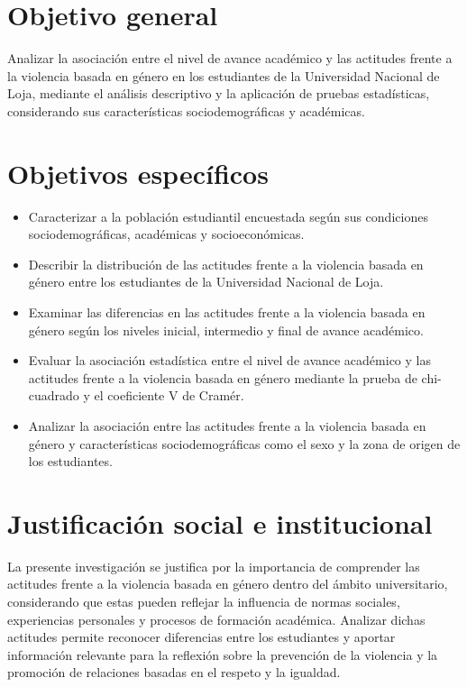 \documentclass[
  spanish,
  11pt,
  letterpaper,
  DIV=11,
  numbers=noendperiod]{scrreprt}
\begin{document}
\section{Objetivo general}\label{objetivo-general}

Analizar la asociación entre el nivel de avance académico y las
actitudes frente a la violencia basada en género en los estudiantes de
la Universidad Nacional de Loja, mediante el análisis descriptivo y la
aplicación de pruebas estadísticas, considerando sus características
sociodemográficas y académicas.

\section{Objetivos específicos}\label{objetivos-especuxedficos}

\begin{itemize}
\item
  Caracterizar a la población estudiantil encuestada según sus
  condiciones sociodemográficas, académicas y socioeconómicas.
\item
  Describir la distribución de las actitudes frente a la violencia
  basada en género entre los estudiantes de la Universidad Nacional de
  Loja.
\item
  Examinar las diferencias en las actitudes frente a la violencia basada
  en género según los niveles inicial, intermedio y final de avance
  académico.
\item
  Evaluar la asociación estadística entre el nivel de avance académico y
  las actitudes frente a la violencia basada en género mediante la
  prueba de chi-cuadrado y el coeficiente V de Cramér.
\item
  Analizar la asociación entre las actitudes frente a la violencia
  basada en género y características sociodemográficas como el sexo y la
  zona de origen de los estudiantes.
\end{itemize}

\section{Justificación social e
institucional}\label{justificaciuxf3n-social-e-institucional}

La presente investigación se justifica por la importancia de comprender
las actitudes frente a la violencia basada en género dentro del ámbito
universitario, considerando que estas pueden reflejar la influencia de
normas sociales, experiencias personales y procesos de formación
académica. Analizar dichas actitudes permite reconocer diferencias entre
los estudiantes y aportar información relevante para la reflexión sobre
la prevención de la violencia y la promoción de relaciones basadas en el
respeto y la igualdad.
\end{document}
